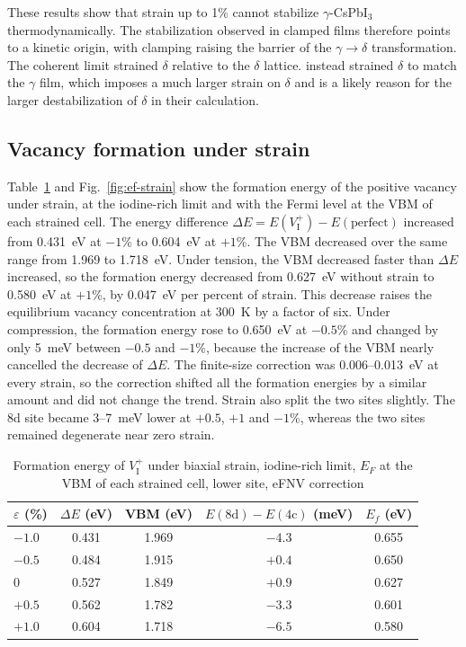 These results show that strain up to 1\% cannot stabilize $\gamma$-CsPbI$_3$ thermodynamically. The stabilization observed in clamped films \citep{Steele2019} therefore points to a kinetic origin, with clamping raising the barrier of the $\gamma\rightarrow\delta$ transformation. The coherent limit strained $\delta$ relative to the $\delta$ lattice. \citet{Steele2019} instead strained $\delta$ to match the $\gamma$ film, which imposes a much larger strain on $\delta$ and is a likely reason for the larger destabilization of $\delta$ in their calculation.

\subsection{Vacancy formation under strain}

Table~\ref{tab:ef-strain} and Fig.~\ref{fig:ef-strain} show the formation energy of the positive vacancy under strain, at the iodine-rich limit and with the Fermi level at the VBM of each strained cell. The energy difference $\Delta E = E(V_\mathrm{I}^{+}) - E(\mathrm{perfect})$ increased from 0.431~eV at $-1$\% to 0.604~eV at $+1$\%. The VBM decreased over the same range from 1.969 to 1.718~eV. Under tension, the VBM decreased faster than $\Delta E$ increased, so the formation energy decreased from 0.627~eV without strain to 0.580~eV at $+1$\%, by 0.047~eV per percent of strain. This decrease raises the equilibrium vacancy concentration at 300~K by a factor of six. Under compression, the formation energy rose to 0.650~eV at $-0.5$\% and changed by only 5~meV between $-0.5$ and $-1$\%, because the increase of the VBM nearly cancelled the decrease of $\Delta E$. The finite-size correction was 0.006--0.013~eV at every strain, so the correction shifted all the formation energies by a similar amount and did not change the trend. Strain also split the two sites slightly. The 8d site became 3--7~meV lower at $+0.5$, $+1$ and $-1$\%, whereas the two sites remained degenerate near zero strain.

\begin{table}[htbp]
  \centering
  \caption{Formation energy of $V_\mathrm{I}^{+}$ under biaxial strain, iodine-rich limit, $E_F$ at the VBM of each strained cell, lower site, eFNV correction}
  \label{tab:ef-strain}
  \begin{tabular}{lcccc}
    \toprule
    $\varepsilon$ (\%) & $\Delta E$ (eV) & VBM (eV) & $E(\mathrm{8d}) - E(\mathrm{4c})$ (meV) & $E_f$ (eV) \\
    \midrule
    $-1.0$ & 0.431 & 1.969 & $-4.3$ & 0.655 \\
    $-0.5$ & 0.484 & 1.915 & $+0.4$ & 0.650 \\
    0 & 0.527 & 1.849 & $+0.9$ & 0.627 \\
    $+0.5$ & 0.562 & 1.782 & $-3.3$ & 0.601 \\
    $+1.0$ & 0.604 & 1.718 & $-6.5$ & 0.580 \\
    \bottomrule
  \end{tabular}
\end{table}

